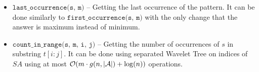 \begin{itemize}
\begin{itemize}
        \item Optimal RMQ algorithm \cite{RMQ1} (Sparse table + Cartesian trees + segmentation) -- optimal algorithm finds an answer in $\bigO(1)$ time and requires only $\bigO(n)$ time for preprocessing.
    \end{itemize}
    \item $\texttt{last\_occurrence(s, m)}$ -- Getting the last occurrence of the pattern. It can be done similarly to $\texttt{first\_occurrence(s, m)}$ with the only change that the answer is maximum instead of minimum.
    \item $\texttt{count\_in\_range(s, m, i, j)}$ -- Getting the number of occurrences of $s$ in substring $t[i:j]$. It can be done using separated Wavelet Tree on indices of $SA$ using at most $\mathcal{O}(m\cdot g(n, |\mathcal{A}|) + \log (n))$ operations.
\end{itemize}
